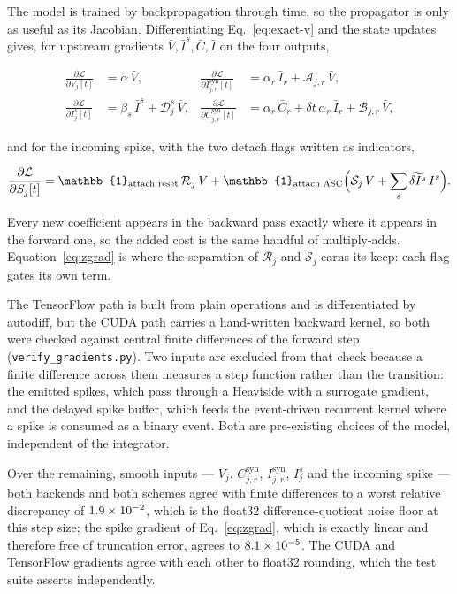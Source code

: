 \documentclass[11pt,a4paper,numbers=noenddot]{scrartcl}
\newcommand{\dt}{\delta t}
\newcommand{\Isyn}{I^{\mathrm{syn}}}
\newcommand{\Csyn}{C^{\mathrm{syn}}}
\newcommand{\amem}{\alpha}
\newcommand{\asyn}{\alpha_{r}}
\newcommand{\Acoef}{\mathcal{A}}
\newcommand{\Bcoef}{\mathcal{B}}
\newcommand{\Dcoef}{\mathcal{D}}
\newcommand{\Rcoef}{\mathcal{R}}
\newcommand{\Scoef}{\mathcal{S}}
\newcommand{\code}[1]{\texttt{\small #1}}
\begin{document}
The model is trained by backpropagation through time, so the propagator is only
as useful as its Jacobian. Differentiating Eq.~\eqref{eq:exact-v} and the state
updates gives, for upstream gradients $\bar V, \bar I^{s}, \bar C, \bar I$ on
the four outputs,

\begin{equation}
\label{eq:jacobian}
\begin{aligned}
\frac{\partial \mathcal{L}}{\partial V_j[t]} &= \amem\,\bar V, &
\frac{\partial \mathcal{L}}{\partial \Isyn_{j,r}[t]}
  &= \asyn\,\bar I_{r} + \Acoef_{j,r}\,\bar V, \\[0.25em]
\frac{\partial \mathcal{L}}{\partial I^{s}_j[t]}
  &= \beta_s\,\bar I^{s} + \Dcoef^{s}_{j}\,\bar V, &
\frac{\partial \mathcal{L}}{\partial \Csyn_{j,r}[t]}
  &= \asyn\,\bar C_{r} + \dt\,\asyn\,\bar I_{r}
     + \Bcoef_{j,r}\,\bar V,
\end{aligned}
\end{equation}

and for the incoming spike, with the two detach flags written as indicators,

\begin{equation}
\label{eq:zgrad}
\frac{\partial \mathcal{L}}{\partial S_j[t]}
  = \mathbb{1}_{\text{attach reset}}\,\Rcoef_j\,\bar V
  + \mathbb{1}_{\text{attach ASC}}
    \Bigl(\Scoef_j\,\bar V
        + \sum_{s}\widetilde{\delta I^{s}}\,\bar I^{s}\Bigr).
\end{equation}

Every new coefficient appears in the backward pass exactly where it appears in
the forward one, so the added cost is the same handful of multiply-adds.
Equation~\eqref{eq:zgrad} is where the separation of $\Rcoef_j$ and $\Scoef_j$
earns its keep: each flag gates its own term.

The TensorFlow path is built from plain operations and is differentiated by
autodiff, but the CUDA path carries a hand-written backward kernel, so both were
checked against central finite differences of the forward step
(\code{verify\_gradients.py}). Two inputs are excluded from that check because a
finite difference across them measures a step function rather than the
transition: the emitted spikes, which pass through a Heaviside with a surrogate
gradient, and the delayed spike buffer, which feeds the event-driven recurrent
kernel where a spike is consumed as a binary event. Both are pre-existing
choices of the model, independent of the integrator.

Over the remaining, smooth inputs --- $V_j$, $\Csyn_{j,r}$, $\Isyn_{j,r}$,
$I^{s}_j$ and the incoming spike --- both backends and both schemes agree with
finite differences to a worst relative discrepancy of $1.9\times 10^{-2}$, which is the
float32 difference-quotient noise floor at this step size; the spike gradient of
Eq.~\eqref{eq:zgrad}, which is exactly linear and therefore free of truncation
error, agrees to $8.1\times 10^{-5}$. The CUDA and TensorFlow gradients agree with
each other to float32 rounding, which the test suite asserts independently.
\end{document}
